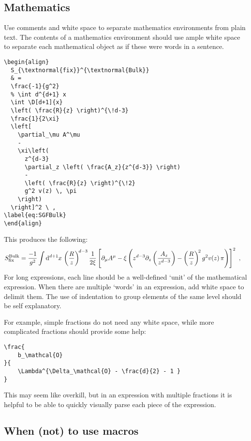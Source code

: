 \subsection{Mathematics}

Use comments and white space to separate mathematics environments from plain text.
% 
The contents of a mathematics environment should use ample white space to separate each mathematical object as if these were words in a sentence.
% 
\begin{lstlisting}[style=latexstyle]
\begin{align}
  S_{\textnormal{fix}}^{\textnormal{Bulk}}
  & =
  \frac{-1}{g^2} 
  % \int d^{d+1} x  
  \int \D[d+1]{x}  
  \left( \frac{R}{z} \right)^{\!d-3}
  \frac{1}{2\xi}
  \left[
    \partial_\mu A^\mu
    -
    \xi\left( 
      z^{d-3} 
      \partial_z \left( \frac{A_z}{z^{d-3}} \right)
      -
      \left( \frac{R}{z} \right)^{\!2} 
      g^2 v(z) \, \pi
    \right)
  \right]^2 \ ,
\label{eq:SGFBulk}
\end{align}
\end{lstlisting}
% 
This produces the following:
\begin{align}
	S_{\textnormal{fix}}^{\textnormal{Bulk}}
	& =
	\frac{-1}{g^2} 
	\int \D[d+1]{x}  
	\left( \frac{R}{z} \right)^{\!d-3}\frac{1}{2\xi}
	\left[
	    \partial_\mu A^\mu
	    -
	    \xi\left( 
	        z^{d-3} \partial_z \left(\frac{A_z}{z^{d-3}}\right)
	        -
	        \left(\frac{R}{z}\right)^{\!2} g^2 v(z)\, \pi
	    \right)
	\right]^2 \ ,
\end{align}
For long expressions, each line should be a well-defined `unit' of the mathematical expression. When there are multiple `words' in an expression, add white space to delimit them. The use of indentation to group elements of the same level should be self explanatory.

For example, simple fractions do not need any white space, while more complicated fractions should provide some help:
% 
\begin{lstlisting}[style=latexstyle]
\frac{ 
	b_\mathcal{O}
}{
	\Lambda^{\Delta_\mathcal{O} - \frac{d}{2} - 1 }
} 
\end{lstlisting}
% 
This may seem like overkill, but in an expression with multiple fractions it is helpful to be able to quickly visually parse each piece of the expression.


\subsection{When (not) to use macros}

